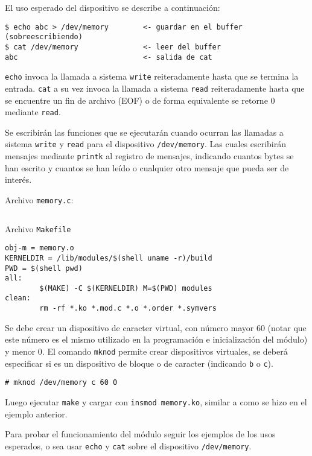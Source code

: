 El uso esperado del dispositivo se describe a continuación:
\begin{verbatim}
$ echo abc > /dev/memory        <- guardar en el buffer (sobreescribiendo)
$ cat /dev/memory               <- leer del buffer
abc                             <- salida de cat
\end{verbatim}

\texttt{echo} invoca la llamada a sistema \texttt{write} reiteradamente hasta que se termina la entrada. \texttt{cat} a su vez invoca la llamada a sistema \texttt{read} reiteradamente hasta que se encuentre un fin de archivo (EOF) o de forma equivalente se retorne 0 mediante \texttt{read}.

Se escribirán las funciones que se ejecutarán cuando ocurran las llamadas a sistema \texttt{write} y \texttt{read} para el dispositivo \texttt{/dev/memory}. Las cuales escribirán mensajes mediante \texttt{printk} al registro de mensajes, indicando cuantos bytes se han escrito y cuantos se han leído o cualquier otro mensaje que pueda ser de interés.

Archivo \texttt{memory.c}:
\begin{verbatim}

\end{verbatim}

Archivo \texttt{Makefile}
\begin{verbatim}
obj-m = memory.o
KERNELDIR = /lib/modules/$(shell uname -r)/build
PWD = $(shell pwd)
all:
        $(MAKE) -C $(KERNELDIR) M=$(PWD) modules
clean:
        rm -rf *.ko *.mod.c *.o *.order *.symvers
\end{verbatim}

Se debe crear un dispositivo de caracter virtual, con número mayor 60 (notar que este número es el mismo utilizado en la programación e inicialización del módulo) y menor 0. El comando \texttt{mknod} permite crear dispositivos virtuales, se deberá especificar si es un dispositivo de bloque o de caracter (indicando \texttt{b} o \texttt{c}).
\begin{verbatim}
# mknod /dev/memory c 60 0
\end{verbatim}

Luego ejecutar \texttt{make} y cargar con \texttt{insmod memory.ko}, similar a como se hizo en el ejemplo anterior.

Para probar el funcionamiento del módulo seguir los ejemplos de los usos esperados, o sea usar \texttt{echo} y \texttt{cat} sobre el dispositivo \texttt{/dev/memory}.

